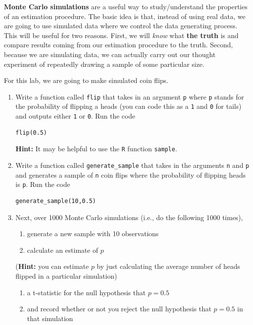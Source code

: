 \documentclass[
  letterpaper,
  DIV=11,
  numbers=noendperiod]{scrreprt}
\begin{document}
\textbf{Monte Carlo simulations} are a useful way to study/understand
the properties of an estimation procedure. The basic idea is that,
instead of using real data, we are going to use simulated data where we
control the data generating process. This will be useful for two
reasons. First, we will \emph{know} what \textbf{the truth} is and
compare results coming from our estimation procedure to the truth.
Second, because we are simulating data, we can actually carry out our
thought experiment of repeatedly drawing a sample of some particular
size.

For this lab, we are going to make simulated coin flips.

\begin{enumerate}
\def\labelenumi{\arabic{enumi}.}
\item
  Write a function called \texttt{flip} that takes in an argument
  \texttt{p} where \texttt{p} stands for the probability of flipping a
  heads (you can code this as a \texttt{1} and \texttt{0} for tails) and
  outputs either \texttt{1} or \texttt{0}. Run the code

\begin{verbatim}
flip(0.5)
\end{verbatim}

  \textbf{Hint:} It may be helpful to use the \texttt{R} function
  \texttt{sample}.
\item
  Write a function called \texttt{generate\_sample} that takes in the
  arguments \texttt{n} and \texttt{p} and generates a sample of
  \texttt{n} coin flips where the probability of flipping heads is
  \texttt{p}. Run the code

\begin{verbatim}
generate_sample(10,0.5)
\end{verbatim}
\item
  Next, over 1000 Monte Carlo simulations (i.e., do the following 1000
  times),

  \begin{enumerate}
  \def\labelenumii{(\roman{enumii})}
  \item
    generate a new sample with 10 observations
  \item
    calculate an estimate of \(p\)
  \end{enumerate}

  (\textbf{Hint:} you can estimate \(p\) by just calculating the average
  number of heads flipped in a particular simulation)

  \begin{enumerate}
  \def\labelenumii{(\roman{enumii})}
  \setcounter{enumii}{2}
  \item
    a t-statistic for the null hypothesis that \(p=0.5\)
  \item
    and record whether or not you reject the null hypothesis that
    \(p=0.5\) in that simulation
  \end{enumerate}
\end{enumerate}
\end{document}
